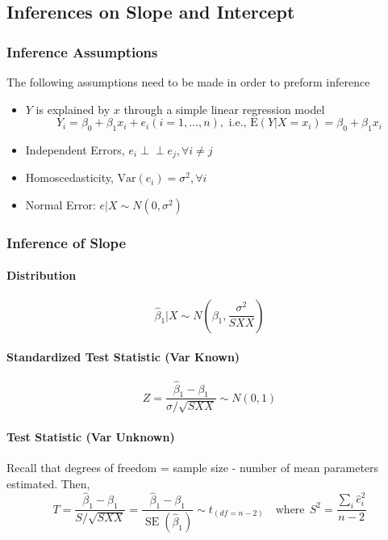 \documentclass[11pt]{article}
\newcommand{\independent}{\perp \!\!\! \perp}
\begin{document}
\subsection{Inferences on Slope and Intercept}
\subsubsection{Inference Assumptions}
The following assumptions need to be made in order to preform inference
\begin{itemize}
    \item $Y$ is explained by $x$ through a simple linear regression model
        \begin{equation*}
            Y_{i}=\beta_{0}+\beta_{1} x_{i}+e_{i}(i=1, \ldots, n), \text { i.e., } \mathrm{E}\left(Y | X=x_{i}\right)=\beta_{0}+\beta_{1} x_{i}
        \end{equation*}
    \item Independent Errors, $e_i \independent e_j, \forall i \neq j$
    \item Homoscedasticity, $\text{Var}(e_i) = \sigma^2, \forall i$
    \item Normal Error: $e | X \sim N\left(0, \sigma^{2}\right)$
\end{itemize}

\subsubsection{Inference of Slope}
\paragraph{Distribution}
\begin{equation*}
    \hat{\beta}_{1} | X \sim N\left(\beta_{1}, \frac{\sigma^{2}}{S X X}\right)
\end{equation*}
\paragraph{Standardized Test Statistic (Var Known)}
\begin{equation*}
    Z=\frac{\hat{\beta}_{1}-\beta_{1}}{\sigma / \sqrt{S X X}} \sim N(0,1)
\end{equation*}
\paragraph{Test Statistic (Var Unknown)}
Recall that degrees of freedom = sample size - number of mean parameters estimated. Then,
\begin{equation*}
    T=\frac{\hat{\beta}_{1}-\beta_{1}}{S / \sqrt{S X X}}=\frac{\hat{\beta}_{1}-\beta_{1}}{\operatorname{SE}\left(\hat{\beta}_{1}\right)} \sim t_{(df=n-2)} \quad \text{where}~~ S^2 = \frac{\sum_i \hat{e}_i^2}{n-2} 
\end{equation*}
\end{document}

